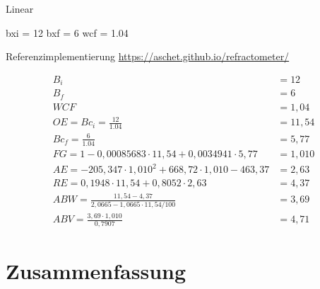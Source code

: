 \documentclass[a4paper,parskip=half]{scrartcl}
\newcommand{\bxi}{\mathit{B}_i}
\newcommand{\bxic}{\mathit{Bc}_i}
\newcommand{\bxf}{\mathit{B}_f}
\newcommand{\bxfc}{\mathit{Bc}_f}
\newcommand{\fg}{\mathit{FG}}
\newcommand{\abv}{\mathit{ABV}}
\newcommand{\abw}{\mathit{ABW}}
\newcommand{\oex}{\mathit{OE}}
\newcommand{\aex}{\mathit{AE}}
\newcommand{\rex}{\mathit{RE}}
\newcommand{\wcf}{\mathit{WCF}}
\begin{document}
Linear

bxi = 12
bxf = 6
wcf = 1.04

Referenzimplementierung \url{https://aschet.github.io/refractometer/}


\begin{align*}
\bxi &= 12 \\
\bxf &= 6 \\
\wcf &= 1,04 \\
\oex = \bxic = \frac{12}{1.04} &= 11,54 \\
\bxfc = \frac{6}{1.04} &= 5,77 \\
\fg = 1 - 0,00085683 \cdot 11,54 + 0,0034941 \cdot 5,77 &= 1,010 \\
\aex = -205,347 \cdot 1,010^2 + 668,72 \cdot 1,010 - 463,37 &= 2,63 \\
\rex = 0,1948 \cdot 11,54 + 0,8052 \cdot 2,63 &= 4,37 \\
\abw = \frac{11,54 - 4,37}{2,0665 - 1,0665 \cdot 11,54 / 100} &= 3,69 \\
\abv = \frac{3,69 \cdot 1,010}{0,7907} &= 4,71
\end{align*}

\section*{Zusammenfassung}

\printbibliography[title=Quellen]
\end{document}
